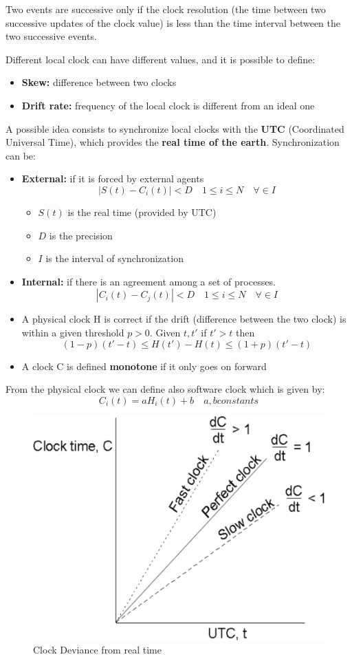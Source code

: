 Two events are successive only if the clock resolution (the time between two successive updates of the clock value) is less than the time interval between the two successive events.

Different local clock can have different values, and it is possible to define:
\begin{itemize}
    \item \textbf{Skew:} difference between two clocks
    \item \textbf{Drift rate:} frequency of the local clock is different from an ideal one
\end{itemize}

A possible idea consists to synchronize local clocks with the \textbf{UTC} (Coordinated Universal Time), which provides the \textbf{real time of the earth}. Synchronization can be:
\begin{itemize}
    \item \textbf{External:} if it is forced by external agents
    \[|S(t) - C_i(t)| < D \quad 1 \leq i \leq N \quad \forall \in I\]
    \begin{itemize}
        \item \(S(t)\) is the real time (provided by UTC)
        \item \(D\) is the precision
        \item \(I\) is the interval of synchronization
    \end{itemize}
    \item \textbf{Internal:} if there is an agreement among a set of processes.
    \[|C_i(t) - C_j(t)| < D \quad 1 \leq i \leq N \quad \forall \in I\]
\end{itemize}

\begin{itemize}
    \item A physical clock H is correct if the drift (difference between the two clock) is within a given threshold \(p > 0\).
    Given \(t, t'\) if \(t' > t\) then
    \[(1 - p)(t' - t) \leq H(t') - H(t) \leq (1 + p)(t' - t)\]
    \item A clock C is defined \textbf{monotone} if it only goes on forward
\end{itemize}

From the physical clock we can define also software clock which is given by:
\[C_i(t) = aH_i(t) + b \quad a, b constants\]

\begin{figure}[!h]
    \centering
    \includegraphics[width=.60\linewidth]{images/Clock/clockDeviance.png}
    \caption{Clock Deviance from real time}
\end{figure}
\newpage

